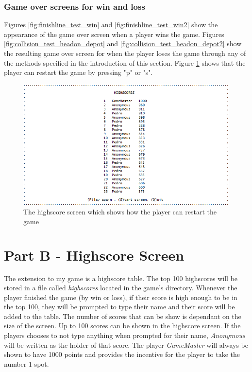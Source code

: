 \documentclass{article}
\begin{document}
\subsubsection*{Game over screens for win and loss}
Figures \ref{fig:finishline_test_win} and \ref{fig:finishline_test_win2} show the appearance of the game over screen when a player wins the game.
\newline
Figures \ref{fig:collision_test_headon_depot} and \ref{fig:collision_test_headon_depot2} show the resulting game over screen for when the player loses the game through any of the methods specified in the introduction of this section.
\newline
Figure \ref{fig:gameover_test_playagain} shows that the player can restart the game by pressing "p" or "s".
\begin{figure}[!ht]
	\begin{center}
	\includegraphics[width=0.6\paperwidth]{images/gameover_test_playagain}
	\caption{The highscore screen which shows how the player can restart the game}
	\label{fig:gameover_test_playagain} 
	\end{center}
\end{figure}

\clearpage

\section{Part B - Highscore Screen}
The extension to my game is a highscore table. The top 100 highscores will be stored in a file called \emph{highscores} located in the game's directory. Whenever the player finished the game (by win or loss), if their score is high enough to be in the top 100, they will be prompted to type their name and their score will be added to the table.
\newline
The number of scores that can be show is dependant on the size of the screen. Up to 100 scores can be shown in the highscore screen. 
\newline
If the players chooses to not type anything when prompted for their name, \emph{Anonymous} will be written as the holder of that score. The player \emph{GameMaster} will always be shown to have 1000 points and provides the incentive for the player to take the number 1 spot.
\end{document}
